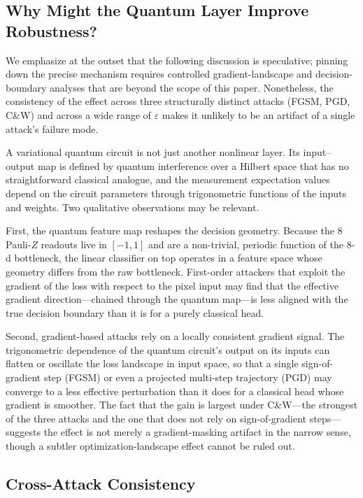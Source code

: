 \documentclass[11pt]{article}
\newcommand{\eps}{\varepsilon}
\begin{document}
\subsection{Why Might the Quantum Layer Improve Robustness?}
\label{sec:disc:mechanism}

We emphasize at the outset that the following discussion is speculative;
pinning down the precise mechanism requires controlled gradient-landscape
and decision-boundary analyses that are beyond the scope of this paper.
Nonetheless, the consistency of the effect across three structurally
distinct attacks (FGSM, PGD, C\&W) and across a wide range of $\eps$ makes
it unlikely to be an artifact of a single attack's failure mode.

A variational quantum circuit is not just another nonlinear layer. Its
input--output map is defined by quantum interference over a Hilbert space
that has no straightforward classical analogue, and the measurement
expectation values depend on the circuit parameters through trigonometric
functions of the inputs and weights. Two qualitative observations may be
relevant.

First, the quantum feature map reshapes the decision geometry. Because
the 8 Pauli-$Z$ readouts live in $[-1,1]$ and are a non-trivial,
periodic function of the 8-d bottleneck, the linear classifier on top
operates in a feature space whose geometry differs from the raw
bottleneck. First-order attackers that exploit the gradient of the loss
with respect to the pixel input may find that the effective gradient
direction---chained through the quantum map---is less aligned with the
true decision boundary than it is for a purely classical head.

Second, gradient-based attacks rely on a locally consistent gradient
signal. The trigonometric dependence of the quantum circuit's output on
its inputs can flatten or oscillate the loss landscape in input space,
so that a single sign-of-gradient step (FGSM) or even a projected
multi-step trajectory (PGD) may converge to a less effective perturbation
than it does for a classical head whose gradient is smoother. The fact
that the gain is largest under C\&W---the strongest of the three attacks
and the one that does not rely on sign-of-gradient steps---suggests the
effect is not merely a gradient-masking artifact in the narrow sense, though
a subtler optimization-landscape effect cannot be ruled out.

\subsection{Cross-Attack Consistency}
\label{sec:disc:consistency}
\end{document}
